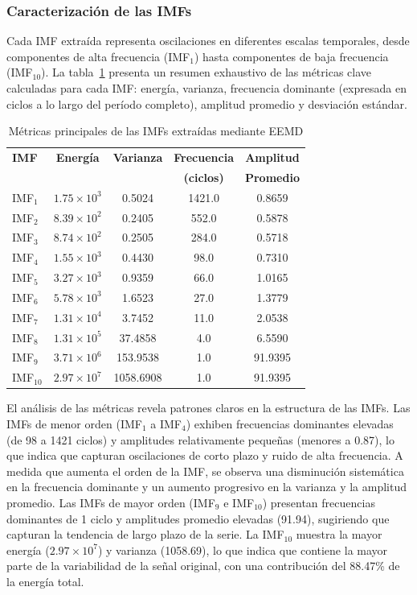 \documentclass[11pt,a4paper]{article}
\begin{document}
\subsubsection{Caracterización de las IMFs}

Cada IMF extraída representa oscilaciones en diferentes escalas temporales, desde componentes de alta frecuencia (IMF$_1$) hasta componentes de baja frecuencia (IMF$_{10}$). La tabla~\ref{tab:imf_metrics} presenta un resumen exhaustivo de las métricas clave calculadas para cada IMF: energía, varianza, frecuencia dominante (expresada en ciclos a lo largo del período completo), amplitud promedio y desviación estándar.

\begin{table}[h]
\centering
\caption{Métricas principales de las IMFs extraídas mediante EEMD}
\label{tab:imf_metrics}
\small
\begin{tabular}{lcccc}
\toprule
\textbf{IMF} & \textbf{Energía} & \textbf{Varianza} & \textbf{Frecuencia} & \textbf{Amplitud} \\
 & & & \textbf{(ciclos)} & \textbf{Promedio} \\
\midrule
IMF$_1$ & $1.75 \times 10^3$ & 0.5024 & 1421.0 & 0.8659 \\
IMF$_2$ & $8.39 \times 10^2$ & 0.2405 & 552.0 & 0.5878 \\
IMF$_3$ & $8.74 \times 10^2$ & 0.2505 & 284.0 & 0.5718 \\
IMF$_4$ & $1.55 \times 10^3$ & 0.4430 & 98.0 & 0.7310 \\
IMF$_5$ & $3.27 \times 10^3$ & 0.9359 & 66.0 & 1.0165 \\
IMF$_6$ & $5.78 \times 10^3$ & 1.6523 & 27.0 & 1.3779 \\
IMF$_7$ & $1.31 \times 10^4$ & 3.7452 & 11.0 & 2.0538 \\
IMF$_8$ & $1.31 \times 10^5$ & 37.4858 & 4.0 & 6.5590 \\
IMF$_9$ & $3.71 \times 10^6$ & 153.9538 & 1.0 & 91.9395 \\
IMF$_{10}$ & $2.97 \times 10^7$ & 1058.6908 & 1.0 & 91.9395 \\
\bottomrule
\end{tabular}
\end{table}

El análisis de las métricas revela patrones claros en la estructura de las IMFs. Las IMFs de menor orden (IMF$_1$ a IMF$_4$) exhiben frecuencias dominantes elevadas (de 98 a 1421 ciclos) y amplitudes relativamente pequeñas (menores a 0.87), lo que indica que capturan oscilaciones de corto plazo y ruido de alta frecuencia. A medida que aumenta el orden de la IMF, se observa una disminución sistemática en la frecuencia dominante y un aumento progresivo en la varianza y la amplitud promedio. Las IMFs de mayor orden (IMF$_9$ e IMF$_{10}$) presentan frecuencias dominantes de 1 ciclo y amplitudes promedio elevadas (91.94), sugiriendo que capturan la tendencia de largo plazo de la serie. La IMF$_{10}$ muestra la mayor energía ($2.97 \times 10^7$) y varianza (1058.69), lo que indica que contiene la mayor parte de la variabilidad de la señal original, con una contribución del 88.47\% de la energía total.
\end{document}
